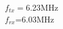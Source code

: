 \documentclass[preview]{standalone}
\begin{document}
\begin{center}
$f_{tx}=$6.23MHz\\$f_{rx}$=6.03MHz
\end{center}
\end{document}
